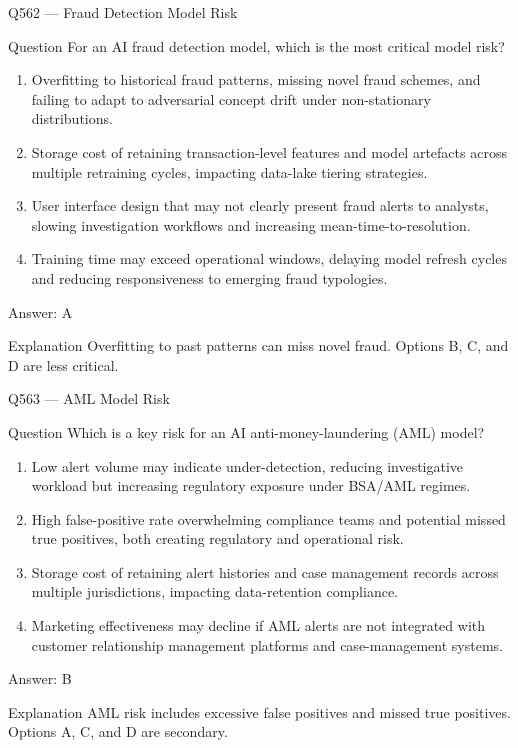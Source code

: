 \documentclass[aspectratio=169,8pt]{beamer}
\begin{document}
	\begin{frame}{Q562 --- Fraud Detection Model Risk}
		\begin{block}{Question}
			For an AI fraud detection model, which is the most critical model risk?
			\begin{enumerate}
				\item Overfitting to historical fraud patterns, missing novel fraud schemes, and failing to adapt to adversarial concept drift under non-stationary distributions.
				\item Storage cost of retaining transaction-level features and model artefacts across multiple retraining cycles, impacting data-lake tiering strategies.
				\item User interface design that may not clearly present fraud alerts to analysts, slowing investigation workflows and increasing mean-time-to-resolution.
				\item Training time may exceed operational windows, delaying model refresh cycles and reducing responsiveness to emerging fraud typologies.
			\end{enumerate}
		\end{block}
		\begin{exampleblock}{Answer: A}\end{exampleblock}
		\begin{block}{Explanation}
			Overfitting to past patterns can miss novel fraud. Options B, C, and D are less critical.
		\end{block}
	\end{frame}
	
	\begin{frame}{Q563 --- AML Model Risk}
		\begin{block}{Question}
			Which is a key risk for an AI anti-money-laundering (AML) model?
			\begin{enumerate}
				\item Low alert volume may indicate under-detection, reducing investigative workload but increasing regulatory exposure under BSA/AML regimes.
				\item High false-positive rate overwhelming compliance teams and potential missed true positives, both creating regulatory and operational risk.
				\item Storage cost of retaining alert histories and case management records across multiple jurisdictions, impacting data-retention compliance.
				\item Marketing effectiveness may decline if AML alerts are not integrated with customer relationship management platforms and case-management systems.
			\end{enumerate}
		\end{block}
		\begin{exampleblock}{Answer: B}\end{exampleblock}
		\begin{block}{Explanation}
			AML risk includes excessive false positives and missed true positives. Options A, C, and D are secondary.
		\end{block}
	\end{frame}
	
\end{document}
